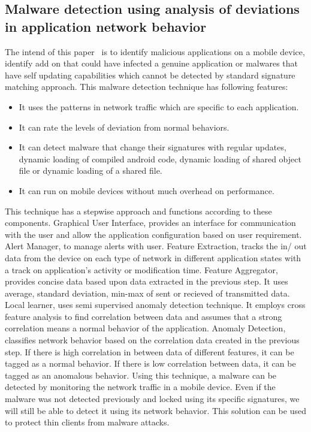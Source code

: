 \documentclass[11pt]{article}
\begin{document}
	\subsection{Malware detection using analysis of deviations in application network behavior}
	The intend of this paper~\cite{shabtai2014mobile} is to identify malicious applications on a mobile device, identify add on that could have infected a genuine application or malwares that have self updating capabilities which cannot be detected by standard signature matching approach. This malware detection technique has following features:
	\begin{itemize}
		\item It uses the patterns in network traffic which are specific to each application.
		\item It can rate the levels of deviation from normal behaviors.
		\item It can detect malware that change their signatures with regular updates, dynamic loading of compiled android code, dynamic loading of shared object file or dynamic loading of a shared file.
		\item It can run on mobile devices without much overhead on performance.
	\end{itemize}
	This technique has a stepwise approach and functions according to these components. Graphical User Interface, provides an interface for communication with the user and allow the application configuration based on user requirement. Alert Manager, to manage alerts with user. Feature Extraction, tracks the in/ out data from the device on each type of network in different application states with a track on application’s activity or modification time. Feature Aggregator, provides concise data based upon data extracted in the previous step. It uses average, standard deviation, min-max of sent or recieved of transmitted data. Local learner, uses semi supervised anomaly detection technique. It employs cross feature analysis to find correlation between data and assumes that a strong correlation means a normal behavior of the application. Anomaly Detection, classifies network behavior based on the correlation data created in the previous step. If there is high correlation in between data of different features, it can be tagged as a normal behavior. If there is low correlation between data, it can be tagged as an anomalous behavior.
	Using this technique, a malware can be detected by monitoring the network traffic in a mobile device. Even if the malware was not detected previously and locked using its specific signatures, we will still be able to detect it using its network behavior. This solution can be used to protect thin clients from malware attacks.
	
\end{document}
